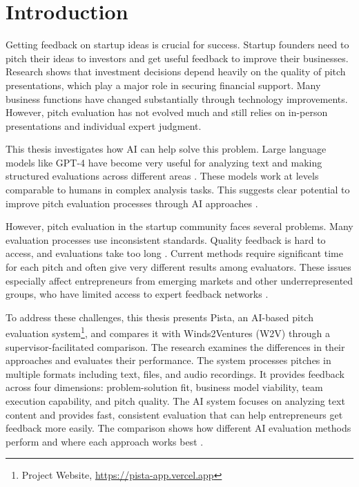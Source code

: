 \chapter{Introduction}

\label{ch:introduction}

Getting feedback on startup ideas is crucial for success. Startup founders need to pitch their ideas to investors and get useful feedback to improve their businesses. Research shows that investment decisions depend heavily on the quality of pitch presentations, which play a major role in securing financial support\cite{masterpresentat}. Many business functions have changed substantially through technology improvements. However, pitch evaluation has not evolved much and still relies on in-person presentations and individual expert judgment.

This thesis investigates how AI can help solve this problem. Large language models like GPT-4 have become very useful for analyzing text and making structured evaluations across different areas \cite{Ozince2024}. These models work at levels comparable to humans in complex analysis tasks. This suggests clear potential to improve pitch evaluation processes through AI approaches \cite{gpt}.

However, pitch evaluation in the startup community faces several problems. Many evaluation processes use inconsistent standards. Quality feedback is hard to access, and evaluations take too long \cite{StartupEvaluati, Kalvapalle2024}. Current methods require significant time for each pitch and often give very different results among evaluators. These issues especially affect entrepreneurs from emerging markets and other underrepresented groups, who have limited access to expert feedback networks \cite{BreakingBarrier}.

To address these challenges, this thesis presents Pista, an AI-based pitch evaluation system\footnote{Project Website, \url{https://pista-app.vercel.app}}, and compares it with Winds2Ventures (W2V) through a supervisor-facilitated comparison. The research examines the differences in their approaches and evaluates their performance. The system processes pitches in multiple formats including text, files, and audio recordings. It provides feedback across four dimensions: problem-solution fit, business model viability, team execution capability, and pitch quality. The AI system focuses on analyzing text content and provides fast, consistent evaluation that can help entrepreneurs get feedback more easily. The comparison shows how different AI evaluation methods perform and where each approach works best \cite{TheFutureofAIEv}.

